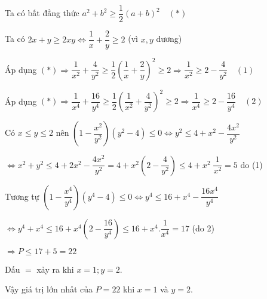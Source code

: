 \begin{ex}
{\begin{enumerate}
          Ta có bất đẳng thức $a^2+b^2 \geq \dfrac{1}{2}(a+b)^2 \quad (*)$
          
          Ta có $2x+y \geq 2xy \Leftrightarrow \dfrac{1}{x}+\dfrac{2}{y} \geq 2 $ (vì $x, y$ dương)
          
          Áp dụng $(*) \Rightarrow \dfrac{1}{x^2}+\dfrac{4}{y^2}\geq \dfrac{1}{2}\left(\dfrac{1}{x}+\dfrac{2}{y}\right)^2\geq 2 \Rightarrow \dfrac{1}{x^2}\geq 2-\dfrac{4}{y^2} \quad (1)$
          
          Áp dụng $(*) \Rightarrow \dfrac{1}{x^4}+\dfrac{16}{y^4}\geq \dfrac{1}{2}\left(\dfrac{1}{x^2}+\dfrac{4}{y^2}\right)^2\geq 2 \Rightarrow \dfrac{1}{x^4}\geq 2-\dfrac{16}{y^4} \quad (2)$
          
          Có $x\leq y\leq 2$ nên $\left(1-\dfrac{x^2}{y^2}\right)(y^2-4)\leq 0\Leftrightarrow y^2\leq 4+x^2-\dfrac{4x^2}{y^2}$
          
          $\Leftrightarrow x^2+y^2\leq 4+2x^2-\dfrac{4x^2}{y^2} = 4+x^2\left(2-\dfrac{4}{y^2}\right)\leq 4+x^2\;\dfrac{1}{x^2} = 5 $ do (1)
          
          Tương tự $\left(1-\dfrac{x^4}{y^4}\right)(y^4-4)\leq 0 \Leftrightarrow y^4\leq 16+x^4-\dfrac{16x^4}{y^4}$
          
          $\Leftrightarrow y^4+x^4 \leq 16+x^4\left(2-\dfrac{16}{y^4}\right)\leq 16+x^4.\dfrac{1}{x^4} = 17$ (do 2)
          
          $\Rightarrow P \leq 17+5 = 22$

			Dấu $=$ xảy ra khi $x = 1; y =2$.
            
            Vậy giá trị lớn nhất của $P  =22$ khi $x = 1$ và $y = 2$.
\end{enumerate}
    }
\end{ex}


